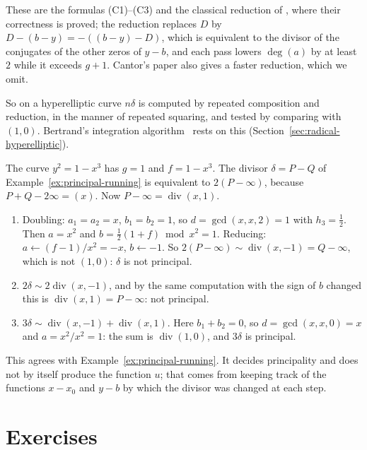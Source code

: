 These are the formulas (C1)--(C3) and the classical reduction of
\cite[\S3 and~\S4]{cantor1987}, where their correctness is proved; the
reduction replaces $D$ by $D - (b - y) = -((b - y) - D)$, which is equivalent
to the divisor of the conjugates of the other zeros of $y - b$, and each pass
lowers $\deg(a)$ by at least $2$ while it exceeds $g + 1$. Cantor's paper also
gives a faster reduction, which we omit.

So on a hyperelliptic curve $n\delta$ is computed by repeated composition
and reduction, in the manner of repeated squaring, and tested by comparing
with $(1, 0)$. Bertrand's integration algorithm~\cite{bertrand1995} rests on
this (Section~\ref{sec:radical-hyperelliptic}).

\begin{example}\label{ex:cantor-running}
The curve $y^2 = 1 - x^3$ has $g = 1$ and $f = 1 - x^3$. The divisor $\delta =
P - Q$ of Example~\ref{ex:principal-running} is equivalent to $2(P -
\infty)$, because $P + Q - 2\infty = (x)$. Now $P - \infty =
\operatorname{div}(x, 1)$.
\begin{enumerate}
\item Doubling: $a_1 = a_2 = x$, $b_1 = b_2 = 1$, so $d = \gcd(x, x, 2) = 1$
  with $h_3 = \frac12$. Then $a = x^2$ and $b = \frac12 (1 + f) \bmod x^2 = 1$.
  Reducing: $a \gets (f - 1)/x^2 = -x$, $b \gets -1$. So $2(P - \infty) \sim
  \operatorname{div}(x, -1) = Q - \infty$, which is not $(1, 0)$: $\delta$ is
  not principal.
\item $2\delta \sim 2 \operatorname{div}(x, -1)$, and by the same computation
  with the sign of $b$ changed this is $\operatorname{div}(x, 1) = P -
  \infty$: not principal.
\item $3\delta \sim \operatorname{div}(x, -1) + \operatorname{div}(x, 1)$.
  Here $b_1 + b_2 = 0$, so $d = \gcd(x, x, 0) = x$ and $a = x^2/x^2 = 1$: the
  sum is $\operatorname{div}(1, 0)$, and $3\delta$ is principal.
\end{enumerate}
This agrees with Example~\ref{ex:principal-running}. It decides principality
and does not by itself produce the function $u$; that comes from keeping
track of the functions $x - x_0$ and $y - b$ by which the divisor was changed
at each step.
\end{example}

\section*{Exercises}

